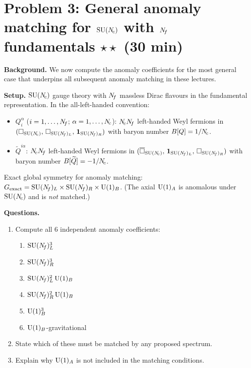 \documentclass[11pt,a4paper]{article}
\begin{document}
\section*{Problem 3: General anomaly matching for $\mathrm{SU}(N_{\!c})$ with $N_{\!f}$
  fundamentals \hfill $\star\star$ \normalsize(30 min)}
\label{prob:general-anomaly}

\noindent\textbf{Background.}
We now compute the \UV{} anomaly coefficients for the most general case
that underpins all subsequent anomaly matching in these lectures.

\medskip
\noindent\textbf{Setup.}
$\mathrm{SU}(N_{\!c})$ gauge theory with $N_{\!f}$ massless Dirac flavours in the
fundamental representation.  In the all-left-handed convention:
\begin{itemize}
  \item $Q_i^\alpha$ ($i = 1,\ldots,N_{\!f}$; $\alpha = 1,\ldots,N_{\!c}$):
    $N_{\!c}N_{\!f}$ left-handed Weyl fermions in
    $(\square_{\mathrm{SU}(N_{\!c})},\,\square_{\mathrm{SU}(N_{\!f})_L},\,\mathbf{1}_{\mathrm{SU}(N_{\!f})_R})$
    with baryon number $B[Q] = 1/N_{\!c}$.
  \item $\widetilde{Q}^{i\alpha}$:
    $N_{\!c}N_{\!f}$ left-handed Weyl fermions in
    $(\overline{\square}_{\mathrm{SU}(N_{\!c})},\,\mathbf{1}_{\mathrm{SU}(N_{\!f})_L},\,\square_{\mathrm{SU}(N_{\!f})_R})$
    with baryon number $B[\widetilde{Q}] = -1/N_{\!c}$.
\end{itemize}

Exact global symmetry for anomaly matching:
$G_{\text{exact}} = \mathrm{SU}(N_{\!f})_L \times \mathrm{SU}(N_{\!f})_R \times \mathrm{U}(1)_B$.
(The axial $\mathrm{U}(1)_A$ is anomalous under $\mathrm{SU}(N_{\!c})$ and is
\emph{not} matched.)

\medskip
\noindent\textbf{Questions.}
\begin{enumerate}[label=(\alph*)]
  \item Compute all 6 independent \UV{} anomaly coefficients:
    \begin{enumerate}[label=(\roman*)]
      \item $\mathrm{SU}(N_{\!f})_L^3$
      \item $\mathrm{SU}(N_{\!f})_R^3$
      \item $\mathrm{SU}(N_{\!f})_L^2\,\mathrm{U}(1)_B$
      \item $\mathrm{SU}(N_{\!f})_R^2\,\mathrm{U}(1)_B$
      \item $\mathrm{U}(1)_B^3$
      \item $\mathrm{U}(1)_B$-gravitational
    \end{enumerate}
  \item State which of these must be matched by any proposed \IR{} spectrum.
  \item Explain why $\mathrm{U}(1)_A$ is not included in the matching conditions.
\end{enumerate}
\end{document}
